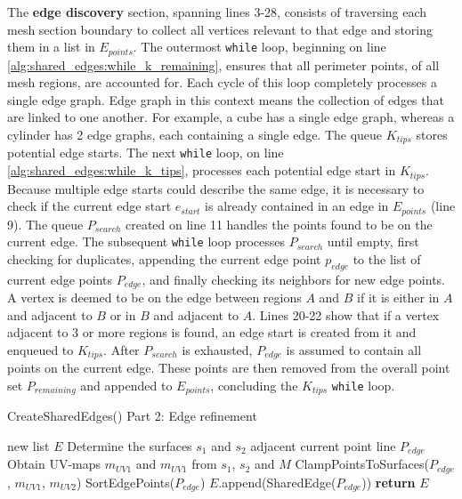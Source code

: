 The \textbf{edge discovery} section, spanning lines 3-28, consists of traversing each mesh section boundary to collect all vertices relevant to that edge and storing them in a list in $E_{points}$.
The outermost \verb|while| loop, beginning on line \ref{alg:shared_edges:while_k_remaining}, ensures that all perimeter points, of all mesh regions, are accounted for.
Each cycle of this loop completely processes a single edge graph.
Edge graph in this context means the collection of edges that are linked to one another.
For example, a cube has a single edge graph, whereas a cylinder has 2 edge graphs, each containing a single edge.
The queue $K_{tips}$ stores potential edge starts.
The next \verb|while| loop, on line \ref{alg:shared_edges:while_k_tips}, processes each potential edge start in $K_{tips}$.
Because multiple edge starts could describe the same edge, it is necessary to check if the current edge start $e_{start}$ is already contained in an edge in $E_{points}$ (line 9).
The queue $P_{search}$ created on line 11 handles the points found to be on the current edge.
The subsequent \verb|while| loop processes $P_{search}$ until empty, first checking for duplicates, appending the current edge point $p_{edge}$ to the list of current edge points $P_{edge}$, and finally checking its neighbors for new edge points.
A vertex is deemed to be on the edge between regions $A$ and $B$ if it is either in $A$ and adjacent to $B$ or in $B$ and adjacent to $A$.
Lines 20-22 show that if a vertex adjacent to 3 or more regions is found, an edge start is created from it and enqueued to $K_{tips}$.
After $P_{search}$ is exhausted, $P_{edge}$ is assumed to contain all points on the current edge.
These points are then removed from the overall point set $P_{remaining}$ and appended to $E_{points}$, concluding the $K_{tips}$ \verb|while| loop.

\begin{algorithm}[htb]
	\caption{CreateSharedEdges() Part 2: Edge refinement}\label{alg:shared_edges_2}
\begin{algorithmic}[1]
	\State new list $E$ 
	\label{alg:edge_refinement_for}
		\State Determine the surfaces $s_1$ and $s_2$ adjacent current point line $P_{edge}$
		\State Obtain UV-maps $m_{UV1}$ and $m_{UV1}$ from $s_1$, $s_2$ and $M$
		\State ClampPointsToSurfaces($P_{edge}$, $m_{UV1}$, $m_{UV2}$)\label{alg:edge_refinement_clamp_pts}
		\State SortEdgePoints($P_{edge}$)
		\State $E$.append(SharedEdge($P_{edge}$))
	\EndFor
	\State \textbf{return} $E$
\EndFunction
\end{algorithmic}
\end{algorithm}


